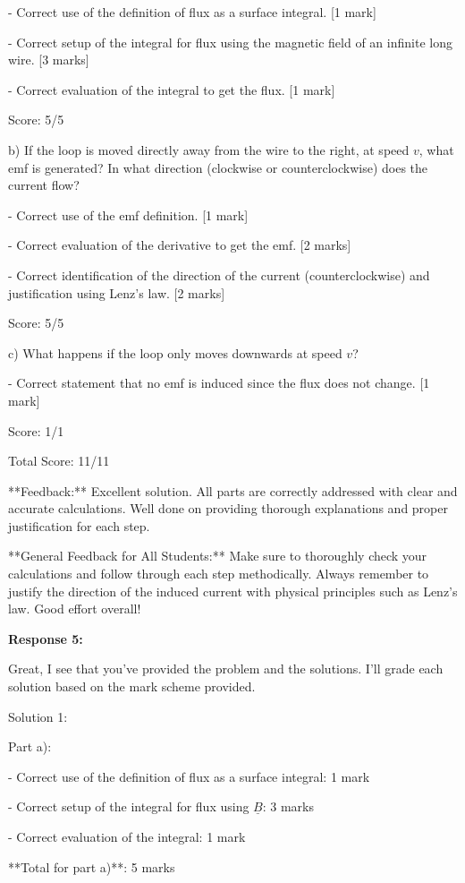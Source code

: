 \documentclass[a4paper,11pt]{article}
\begin{document}
- Correct use of the definition of flux as a surface integral. [1 mark]

- Correct setup of the integral for flux using the magnetic field of an infinite long wire. [3 marks]

- Correct evaluation of the integral to get the flux. [1 mark]

Score: 5/5

b) If the loop is moved directly away from the wire to the right, at speed \( v \), what emf is generated? In what direction (clockwise or counterclockwise) does the current flow?

- Correct use of the emf definition. [1 mark]

- Correct evaluation of the derivative to get the emf. [2 marks]

- Correct identification of the direction of the current (counterclockwise) and justification using Lenz's law. [2 marks]

Score: 5/5

c) What happens if the loop only moves downwards at speed \( v \)?

- Correct statement that no emf is induced since the flux does not change. [1 mark]

Score: 1/1

Total Score: 11/11

**Feedback:** Excellent solution. All parts are correctly addressed with clear and accurate calculations. Well done on providing thorough explanations and proper justification for each step.

**General Feedback for All Students:** Make sure to thoroughly check your calculations and follow through each step methodically. Always remember to justify the direction of the induced current with physical principles such as Lenz's law. Good effort overall!

\bigskip
\textbf{Response 5:}

Great, I see that you've provided the problem and the solutions. I'll grade each solution based on the mark scheme provided.

Solution 1:

Part a):

- Correct use of the definition of flux as a surface integral: 1 mark

- Correct setup of the integral for flux using \( \underline{B} \): 3 marks

- Correct evaluation of the integral: 1 mark

**Total for part a)**: 5 marks
\end{document}
